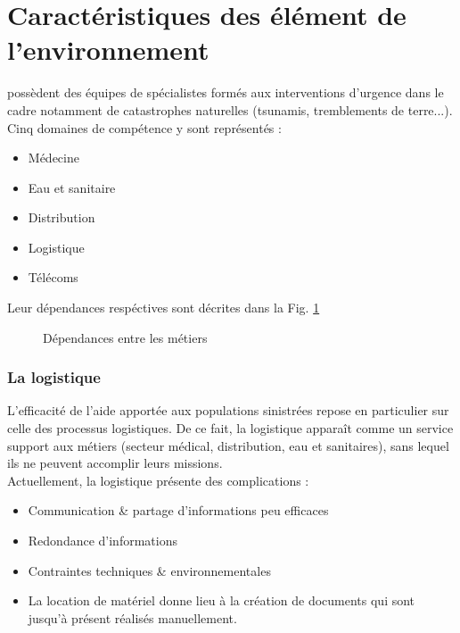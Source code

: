 \section{Caractéristiques des élément de l'environnement}
\mo possèdent des équipes de spécialistes formés aux interventions d'urgence dans le cadre notamment de catastrophes naturelles (tsunamis, tremblements de terre...).
Cinq domaines de compétence y sont représentés :
\begin{itemize}
\item Médecine
\item Eau et sanitaire
\item Distribution
\item Logistique
\item Télécoms
\end{itemize}
Leur dépendances respéctives sont décrites dans la Fig. \ref{dep}
\vspace{1cm}
\begin{figure}[H]
\centering
{}
\caption{Dépendances entre les métiers}
\label{dep}
\end{figure}
\subsubsection{La logistique}
L'efficacité de l'aide apportée aux populations sinistrées repose en particulier sur celle des processus logistiques. De ce fait, la logistique apparaît comme un service support aux métiers (secteur médical, distribution, eau et sanitaires), sans lequel ils ne peuvent accomplir leurs missions.
\\
Actuellement, la logistique présente des complications :
\begin{itemize}
\item Communication \& partage d'informations peu efficaces
\item Redondance d'informations
\item Contraintes techniques \& environnementales
\item La location de matériel donne lieu à la création de documents qui sont jusqu'à présent réalisés manuellement.
\end{itemize}

